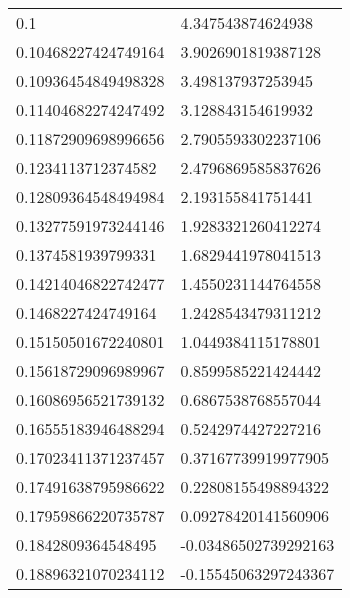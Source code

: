 \tiny
{}
\begin{supertabular}{ll}
0.1                 & 4.347543874624938    \\
0.10468227424749164 & 3.9026901819387128   \\
0.10936454849498328 & 3.498137937253945    \\
0.11404682274247492 & 3.128843154619932    \\
0.11872909698996656 & 2.7905593302237106   \\
0.1234113712374582  & 2.4796869585837626   \\
0.12809364548494984 & 2.193155841751441    \\
0.13277591973244146 & 1.9283321260412274   \\
0.1374581939799331  & 1.6829441978041513   \\
0.14214046822742477 & 1.4550231144764558   \\
0.1468227424749164  & 1.2428543479311212   \\
0.15150501672240801 & 1.0449384115178801   \\
0.15618729096989967 & 0.8599585221424442   \\
0.16086956521739132 & 0.6867538768557044   \\
0.16555183946488294 & 0.5242974427227216   \\
0.17023411371237457 & 0.37167739919977905  \\
0.17491638795986622 & 0.22808155498894322  \\
0.17959866220735787 & 0.09278420141560906  \\
0.1842809364548495  & -0.03486502739292163 \\
0.18896321070234112 & -0.15545063297243367 \\
\end{supertabular} \tablehead{}
